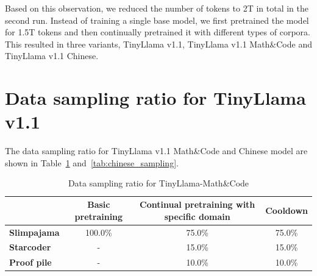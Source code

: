 \documentclass{article}
\begin{document}
Based on this observation, we reduced the number of tokens to 2T in total in the second run.
Instead of training a single base model, we first pretrained the model for 1.5T tokens and then continually pretrained it with different types of corpora. This resulted in three variants, TinyLlama v1.1, TinyLlama v1.1 Math\&Code and TinyLlama v1.1 Chinese.




\section{Data sampling ratio for TinyLlama v1.1}\label{appendix:data_sampling}
The data sampling ratio for TinyLlama v1.1 Math\&Code and Chinese model are shown in Table~\ref{tab:math_code_sampling} and~\ref{tab:chinese_sampling}.



\begin{table}[htbp]
  \centering
  \small
  \caption{ 
    Data sampling ratio for TinyLlama-Math\&Code
  }
  \begin{tabular}{lccc}
    \toprule
     & \textbf{Basic pretraining}	& \textbf{Continual pretraining with specific domain}	& \textbf{Cooldown}	\\

    \midrule    
    \textbf{Slimpajama} \xspace    & 100.0\%  &  75.0\%	& 75.0\% \\
    \textbf{Starcoder}\xspace    & -  &   	15.0\%	& 	15.0\% \\
    \textbf{Proof pile}\xspace    & -     &  	10.0\%	& 	10.0\% \\
    \bottomrule
  \end{tabular}
  \label{tab:math_code_sampling}
\end{table}
\end{document}
